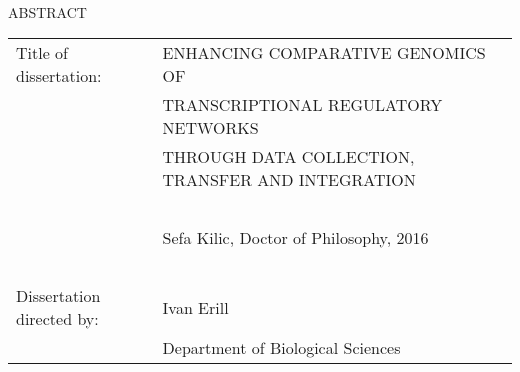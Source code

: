 
\hbox{\ }

\renewcommand{\baselinestretch}{1}
\small \normalsize

\begin{center}
\large{{ABSTRACT}}

\vspace{3em}

\end{center}
\hspace{-.15in}
\begin{tabular}{ll}
Title of dissertation:    & {\large ENHANCING COMPARATIVE GENOMICS OF}\\
&				      {\large TRANSCRIPTIONAL REGULATORY NETWORKS} \\
&				      {\large THROUGH DATA COLLECTION, TRANSFER AND INTEGRATION} \\
\ \\
&                          {\large  Sefa Kilic, Doctor of Philosophy, 2016} \\
\ \\
Dissertation directed by: & {\large  Ivan Erill} \\
&  				{\large	 Department of Biological Sciences } \\
\end{tabular}

\vspace{3em}

\renewcommand{\baselinestretch}{2}
\large \normalsize

